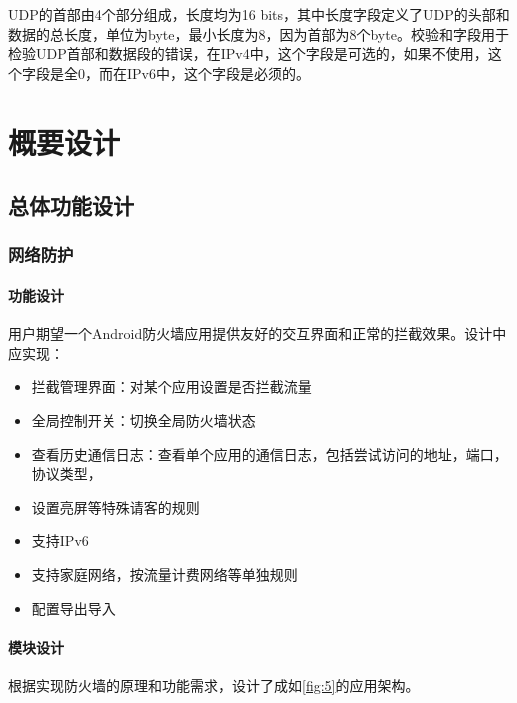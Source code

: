 \documentclass[format=final, language=chinese, degree=fyp]{hustthesis}
\begin{document}
UDP的首部由4个部分组成，长度均为16 bits，其中长度字段定义了UDP的头部和数据的总长度，单位为byte，最小长度为8，因为首部为8个byte。校验和字段用于检验UDP首部和数据段的错误，在IPv4中，这个字段是可选的，如果不使用，这个字段是全0，而在IPv6中，这个字段是必须的。


\chapter{概要设计}

\section{总体功能设计}



\subsection{网络防护}

\subsubsection{功能设计}

用户期望一个Android防火墙应用提供友好的交互界面和正常的拦截效果。设计中应实现：
\begin{itemize}
    \item 拦截管理界面：对某个应用设置是否拦截流量
    \item 全局控制开关：切换全局防火墙状态
    \item 查看历史通信日志：查看单个应用的通信日志，包括尝试访问的地址，端口，协议类型，
    \item 设置亮屏等特殊请客的规则
    \item 支持IPv6
    \item 支持家庭网络，按流量计费网络等单独规则
    \item 配置导出导入
\end{itemize}

\subsubsection{模块设计}

根据实现防火墙的原理和功能需求，设计了成如\autoref{fig:5}的应用架构。
\end{document}
